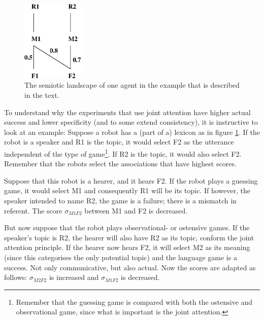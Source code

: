 \begin{figure}[t]
\centerline{\includegraphics[width=3cm]{feedback/example.eps}}
\caption{The semiotic landscape of one agent in the example that is described in the text.}
\label{f:par:example}
\end{figure}


To understand why the experiments that use joint attention have higher actual success and lower specificity (and to some extend consistency), it is instructive to look at an example: Suppose a robot has a (part of a) lexicon as in figure \ref{f:par:example}. If the robot is a speaker and R1 is the topic, it would select F2 as the utterance independent of the type of game\footnote{Remember that the guessing game is compared with both the ostensive and observational game, since what is important is the joint attention.}. If R2 is the topic, it would also select F2. Remember that the robots select the associations that have highest scores.

Suppose that this robot is a hearer, and it hears F2. If the robot plays a guessing game, it would select M1 and consequently R1 will be its topic. If however, the speaker intended to name R2, the game is a failure; there is a mismatch in referent. The score $\sigma_{M1F2}$ between M1 and F2 is decreased.

But now suppose that the robot plays observational- or ostensive games. If the speaker's topic is R2, the hearer will also have R2 as its topic, conform the joint attention principle. If the hearer now hears F2, it will select M2 as its meaning (since this categorises the only potential topic) and the language game is a success. Not only communicative, but also actual. Now the scores are adapted as follows: $\sigma_{M2F2}$ is increased and $\sigma_{M1F2}$ is decreased.

